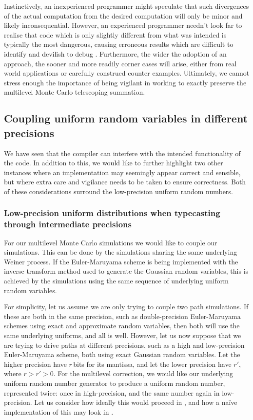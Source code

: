 \documentclass[11pt,a4paper,twoside,english]{extarticle}
\begin{document}
Instinctively, an inexperienced programmer might speculate that such divergences of the actual computation from the desired computation will only be minor and likely inconsequential. However, an experienced programmer needn't look far to realise that code which is only slightly different from what was intended is typically the most dangerous, causing erroneous results which are difficult to identify and devilish to debug \citep[Chapter~27]{higham1993accuracy}. Furthermore, the wider the adoption of an approach, the sooner and more readily corner cases will arise, either from real world applications or carefully construed counter examples. Ultimately, we cannot stress enough the importance of being vigilant in working to exactly preserve the multilevel Monte Carlo telescoping summation. 

\subsection{Coupling uniform random variables in different precisions}


We have seen that the compiler can interfere with the intended functionality of the code. In addition to this, we would like to further highlight two other instances where an implementation may seemingly appear correct and sensible, but where extra care and vigilance needs to be taken to ensure correctness. Both of these considerations surround the low-precision uniform random numbers.


\subsubsection{Low-precision uniform distributions when typecasting through intermediate precisions}


For our multilevel Monte Carlo simulations we would like to couple our simulations. This can be done by the simulations sharing the same underlying Weiner process. If the Euler-Maruyama scheme is being implemented with the inverse transform method used to generate the Gaussian random variables, this is achieved by the simulations using the same sequence of underlying uniform random variables. 

For simplicity, let us assume we are only trying to couple two path simulations. If these are both in the same precision, such as  double-precision Euler-Maruyama schemes using exact and approximate random variables, then both will use the same underlying uniforms, and all is well. However, let us now suppose that we are trying to drive paths at different precisions, such as a high and low-precision Euler-Maruyama scheme,  both using exact Gaussian random variables. Let the higher precision have $ r $\,bits for its mantissa, and let the lower precision have $ r' $, where $ r > r' > 0 $. For the multilevel correction, we would like our underlying uniform random number generator to produce a uniform random number, represented twice: once in high-precision, and the same number again in low-precision. Let us consider how ideally this would proceed in , and how a na\"{i}ve implementation of this may look in .
\end{document}
